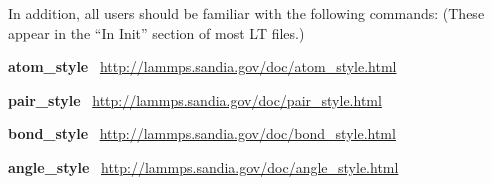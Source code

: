 \documentclass[11pt]{article}
\begin{document}
In addition, all users should be familiar with the following commands:
(These appear in the ``In Init'' section of most LT files.)
\begin{list}{}
\item \textbf{atom\_style} \ \url{http://lammps.sandia.gov/doc/atom_style.html}
\item \textbf{pair\_style} \ \url{http://lammps.sandia.gov/doc/pair_style.html}
\item \textbf{bond\_style} \ \url{http://lammps.sandia.gov/doc/bond_style.html}
\item \textbf{angle\_style} \ \url{http://lammps.sandia.gov/doc/angle_style.html}
\end{list}


\end{document}
